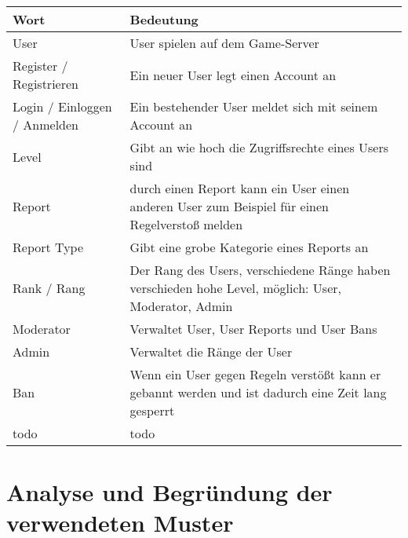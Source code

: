 \begin{center}
    \begin{tabular}{ | l | m{8cm} | }
        \hline
        Wort                         & Bedeutung                                                                                            \\ \hline
        User                         & User spielen auf dem Game-Server                                                                     \\ \hline
        Register / Registrieren      & Ein neuer User legt einen Account an                                                                 \\ \hline
        Login / Einloggen / Anmelden & Ein bestehender User meldet sich mit seinem Account an                                               \\ \hline
        Level                        & Gibt an wie hoch die Zugriffsrechte eines Users sind                                                 \\ \hline
        Report                       & durch einen Report kann ein User einen anderen User zum Beispiel für einen Regelverstoß melden       \\ \hline
        Report Type                  & Gibt eine grobe Kategorie eines Reports an                                                           \\ \hline
        Rank / Rang                  & Der Rang des Users, verschiedene Ränge haben verschieden hohe Level, möglich: User, Moderator, Admin \\ \hline
        Moderator                    & Verwaltet User, User Reports und User Bans                                                           \\ \hline
        Admin                        & Verwaltet die Ränge der User                                                                         \\ \hline
        Ban                          & Wenn ein User gegen Regeln verstößt kann er gebannt werden und ist dadurch eine Zeit lang gesperrt   \\ \hline
        todo                         & todo                                                                                                 \\ \hline
    \end{tabular}
\end{center}


\section{Analyse und Begründung der verwendeten Muster}

